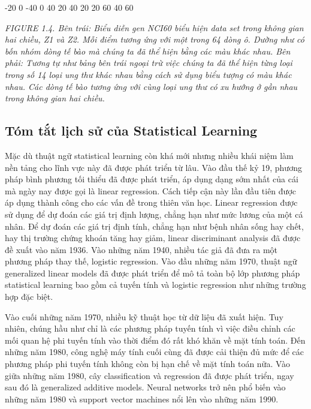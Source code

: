 -20 0 -40 0 40 20  40  20 20 60 40 60

\noindent\textit{FIGURE 1.4. Bên trái: Biểu diễn gen NCI60 biểu hiện data set trong không gian hai chiều, Z1 và Z2. Mỗi điểm tương ứng với một trong 64 dòng ô. Dường như có bốn nhóm dòng tế bào mà chúng ta đã thể hiện bằng các màu khác nhau. Bên phải: Tương tự như bảng bên trái ngoại trừ việc chúng ta đã thể hiện từng loại trong số 14 loại ung thư khác nhau bằng cách sử dụng biểu tượng có màu khác nhau. Các dòng tế bào tương ứng với cùng loại ung thư có xu hướng ở gần nhau trong không gian hai chiều.}

\subsection{Tóm tắt lịch sử của Statistical Learning}

Mặc dù thuật ngữ statistical learning còn khá mới nhưng nhiều khái niệm làm nền tảng cho lĩnh vực này đã được phát triển từ lâu. Vào đầu thế kỷ 19, phương pháp bình phương tối thiểu đã được phát triển, áp dụng dạng sớm nhất của cái mà ngày nay được gọi là linear regression. Cách tiếp cận này lần đầu tiên được áp dụng thành công cho các vấn đề trong thiên văn học. Linear regression được sử dụng để dự đoán các giá trị định lượng, chẳng hạn như mức lương của một cá nhân. Để dự đoán các giá trị định tính, chẳng hạn như bệnh nhân sống hay chết, hay thị trường chứng khoán tăng hay giảm, linear discriminant analysis đã được đề xuất vào năm 1936. Vào những năm 1940, nhiều tác giả đã đưa ra một phương pháp thay thế, logistic regression. Vào đầu những năm 1970, thuật ngữ generalized linear models đã được phát triển để mô tả toàn bộ lớp phương pháp statistical learning bao gồm cả tuyến tính và logistic regression như những trường hợp đặc biệt.

Vào cuối những năm 1970, nhiều kỹ thuật học từ dữ liệu đã xuất hiện. Tuy nhiên, chúng hầu như chỉ là các phương pháp tuyến tính vì việc điều chỉnh các mối quan hệ phi tuyến tính vào thời điểm đó rất khó khăn về mặt tính toán. Đến những năm 1980, công nghệ máy tính cuối cùng đã được cải thiện đủ mức để các phương pháp phi tuyến tính không còn bị hạn chế về mặt tính toán nữa. Vào giữa những năm 1980, cây classification và regression đã được phát triển, ngay sau đó là generalized additive models. Neural networks trở nên phổ biến vào những năm 1980 và support vector machines nổi lên vào những năm 1990.

